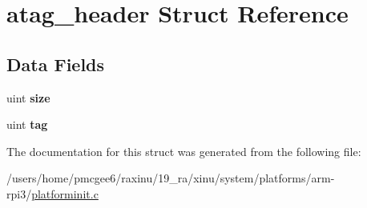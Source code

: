 \hypertarget{structatag__header}{\section{atag\-\_\-header Struct Reference}
\label{structatag__header}
}
\subsection*{Data Fields}
\begin{DoxyCompactItemize}
\item 
\hypertarget{structatag__header_a9a98952cebcc450abd68358ee8e75ea8}{uint {\bfseries size}}\label{structatag__header_a9a98952cebcc450abd68358ee8e75ea8}

\item 
\hypertarget{structatag__header_a9118e8cd3d5766562acef0ddf887ba8f}{uint {\bfseries tag}}\label{structatag__header_a9118e8cd3d5766562acef0ddf887ba8f}

\end{DoxyCompactItemize}


The documentation for this struct was generated from the following file\-:\begin{DoxyCompactItemize}
\item 
/users/home/pmcgee6/raxinu/19\-\_\-ra/xinu/system/platforms/arm-\/rpi3/\hyperlink{platforminit_8c}{platforminit.\-c}\end{DoxyCompactItemize}
